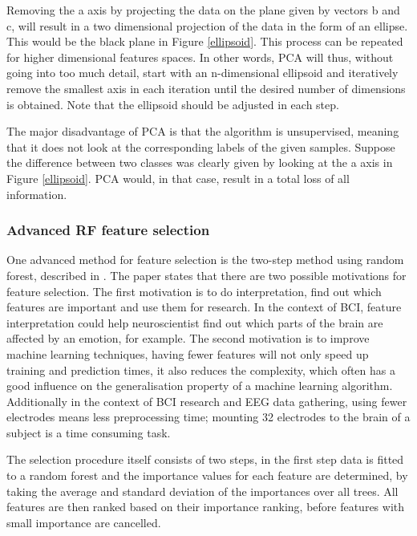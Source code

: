 
Removing the a axis by projecting the data on the plane given by vectors b and c, will result in a two dimensional projection of the data in the form of an ellipse. This would be the black plane in Figure \ref{ellipsoid}. This process can be repeated for higher dimensional features spaces. In other words, PCA will thus, without going into too much detail, start with an n-dimensional ellipsoid and iteratively remove the smallest axis in each iteration until the desired number of dimensions is obtained. Note that the ellipsoid should be adjusted in each step.

\npar

The major disadvantage of PCA is that the algorithm is unsupervised, meaning that it does not look at the corresponding labels of the given samples. Suppose the difference between two classes was clearly given by looking at the a axis in Figure \ref{ellipsoid}. PCA would, in that case, result in a total loss of all information.

\subsubsection{Advanced RF feature selection}
One advanced method for feature selection is the two-step method using random forest, described in \citep{rfPaper}. The paper states that there are two possible motivations for feature selection. The first motivation is to do interpretation, find out which features are important and use them for research. In the context of BCI, feature interpretation could help neuroscientist find out which parts of the brain are affected by an emotion, for example. The second motivation is to improve machine learning techniques, having fewer features will not only speed up training and prediction times, it also reduces the complexity, which often has a good influence on the generalisation property of a machine learning algorithm. Additionally in the context of BCI research and EEG data gathering, using fewer electrodes means less preprocessing time; mounting 32 electrodes to the brain of a subject is a time consuming task.

\npar

The selection procedure itself consists of two steps, in the first step data is fitted to a random forest and the importance values for each feature are determined, by taking the average and standard deviation of the importances over all trees. All features are then ranked based on their importance ranking, before features with small importance are cancelled. 

